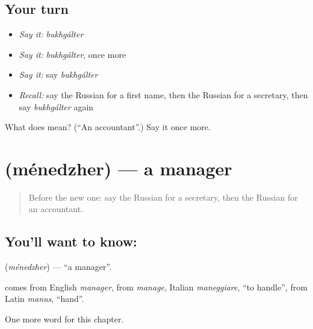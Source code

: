 \subsection*{Your turn}
\begin{itemize}
\raggedright
  \item \emph{Say it:} \emph{bukhgálter}
  \item \emph{Say it:} \emph{bukhgálter}, once more
  \item \emph{Say it:} say \emph{bukhgálter}
  \item \emph{Recall:} say the Russian for a first name, then the Russian for a secretary, then say \emph{bukhgálter} again
\end{itemize}

\begin{tcolorbox}[breakable,colback=teal!4,colframe=teal!35!black,title={Before you move on}]
What does  mean? (\textquotedblleft{}An accountant\textquotedblright{}.) Say it once more.
\end{tcolorbox}
\section[\texorpdfstring{\ru{менеджер} (ménedzher)}{менеджер (ménedzher)}]{ (ménedzher) — a manager}

\label{lesson:RU-C229-menedzher}



\begin{quote}
Before the new one: say the Russian for a secretary, then the Russian for an accountant.
\end{quote}

\subsection*{You'll want to know: }
\textbf{} (\emph{ménedzher}) — \textquotedblleft{}a manager\textquotedblright{}.

\begin{cousinweb}
\textbf{} comes from English \emph{manager}, from \emph{manage}, Italian \emph{maneggiare}, \textquotedblleft{}to handle\textquotedblright{}, from Latin \emph{manus}, \textquotedblleft{}hand\textquotedblright{}.
\end{cousinweb}

\begin{grammarlens}[title={What you've built}]
One more word for this chapter.
\end{grammarlens}

